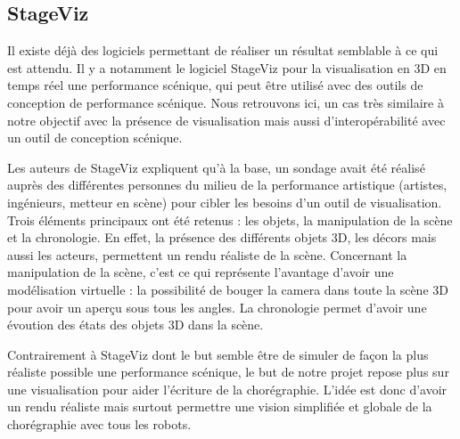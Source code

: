 \subsection{StageViz}
Il existe déjà des logiciels permettant de réaliser un résultat semblable à ce qui est attendu. Il y a notamment le logiciel StageViz pour la visualisation en 3D en temps réel une performance scénique, qui peut être utilisé avec des outils de conception de performance scénique. Nous retrouvons ici, un cas très similaire à notre objectif avec la présence de visualisation mais aussi d'interopérabilité avec un outil de conception scénique.

Les auteurs de StageViz expliquent qu'à la base, un sondage avait été réalisé auprès des différentes personnes du milieu de la performance artistique (artistes, ingénieurs, metteur en scène) pour cibler les besoins d'un outil de visualisation. Trois éléments principaux ont été retenus : les objets, la manipulation de la scène et la chronologie. En effet, la présence des différents objets 3D, les décors mais aussi les acteurs, permettent un rendu réaliste de la scène. Concernant la manipulation de la scène, c'est ce qui représente l'avantage d'avoir une modélisation virtuelle : la possibilité de bouger la camera dans toute la scène 3D pour avoir un aperçu sous tous les angles. La chronologie permet d'avoir une évoution des états des objets 3D dans la scène.

Contrairement à StageViz dont le but semble être de simuler de façon la plus réaliste possible une performance scénique, le but de notre projet repose plus sur une visualisation pour aider l'écriture de la chorégraphie. L'idée est donc d'avoir un rendu réaliste mais surtout permettre une vision simplifiée et globale de la chorégraphie avec tous les robots.

%	
%
%
%
%
